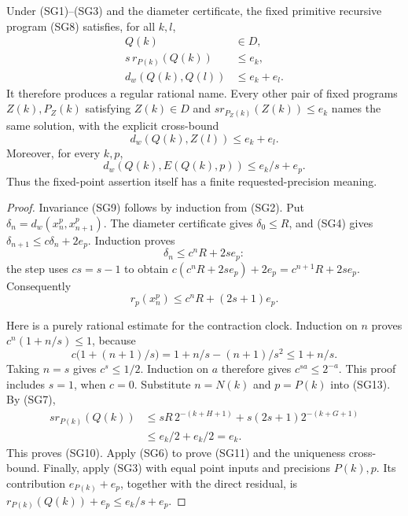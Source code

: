 \begin{theorem}
\label{thm:small-gain-producer}
Under (SG1)--(SG3) and the diameter certificate, the fixed primitive
recursive program (SG8) satisfies, for all $k,l$,
\begin{align}
 Q(k)&\in D,                                    \tag{SG9}\\
 s\,r_{P(k)}(Q(k))&\le e_k,                     \tag{SG10}\\
 d_w(Q(k),Q(l))&\le e_k+e_l.                    \tag{SG11}
\end{align}
It therefore produces a regular rational name.  Every other pair of fixed
programs $Z(k),P_Z(k)$ satisfying $Z(k)\in D$ and
$s r_{P_Z(k)}(Z(k))\le e_k$ names the same solution, with the explicit
cross-bound
\[
 d_w(Q(k),Z(l))\le e_k+e_l.
\]
Moreover, for every $k,p$,
\begin{equation}
 d_w(Q(k),E(Q(k),p))\le e_k/s+e_p.              \tag{SG12}
\end{equation}
Thus the fixed-point assertion itself has a finite requested-precision
meaning.
\end{theorem}
\begin{proof}
Invariance (SG9) follows by induction from (SG2).
Put $\delta_n=d_w(x^p_n,x^p_{n+1})$.
The diameter certificate gives $\delta_0\le R$, and (SG4) gives
$\delta_{n+1}\le c\delta_n+2e_p$.
Induction proves
\[
 \delta_n\le c^nR+2se_p:
\]
the step uses $cs=s-1$ to obtain
$c(c^nR+2se_p)+2e_p=c^{n+1}R+2se_p$.
Consequently
\begin{equation}
 r_p(x^p_n)\le c^nR+(2s+1)e_p.                 \tag{SG13}
\end{equation}

Here is a purely rational estimate for the contraction clock.
Induction on $n$ proves
$c^n(1+n/s)\le1$, because
\[
 c\bigl(1+(n+1)/s\bigr)
 =1+n/s-(n+1)/s^2\le1+n/s.
\]
Taking $n=s$ gives $c^s\le1/2$.  Induction on $a$ therefore gives
$c^{sa}\le2^{-a}$.  This proof includes $s=1$, when $c=0$.
Substitute $n=N(k)$ and $p=P(k)$ into (SG13).  By (SG7),
\[
 \begin{split}
 s r_{P(k)}(Q(k))
 &\le sR\,2^{-(k+H+1)}
       +s(2s+1)2^{-(k+G+1)}\\
 &\le e_k/2+e_k/2=e_k.
 \end{split}
\]
This proves (SG10).  Apply (SG6) to prove (SG11) and the uniqueness
cross-bound.  Finally, apply (SG3) with equal point inputs and precisions
$P(k),p$.  Its contribution $e_{P(k)}+e_p$, together with the direct
residual, is $r_{P(k)}(Q(k))+e_p\le e_k/s+e_p$.
\end{proof}


